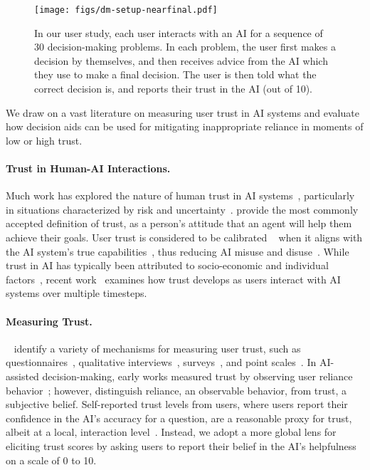 \begin{figure*}
    \centering
    \texttt{[image: figs/dm-setup-nearfinal.pdf]}
    \caption{In our user study, each user interacts with an AI for a sequence of $30$ decision-making problems. In each problem, the user first makes a decision by themselves, and then receives advice from the AI which they use to make a final decision. The user is then told what the correct decision is, and reports their trust in the AI (out of 10).}
    \label{fig:decision_making_setup}
\end{figure*}

We draw on a vast literature on measuring user trust in AI systems and evaluate how decision aids can be used for mitigating inappropriate reliance in moments of low or high trust.

\paragraph{Trust in Human-AI Interactions.} 
Much work has explored the nature of human trust in AI systems~\cite{lai2023towards}, particularly in situations characterized by risk and uncertainty~\cite{jacovi2021formalizing}. 
\citet{lee2004trust} provide the most commonly accepted definition of trust, as a person's attitude that an agent will help them achieve their goals. 
User trust is considered to be calibrated ~\cite{alizadeh2022building} when it aligns with the AI system's true capabilities~\cite{wright2010trust}, thus reducing AI misuse and disuse~\cite{alizadeh2022building}. 
While trust in AI has typically been attributed to socio-economic and individual factors~\cite{bach2024systematic}, recent work~\cite{dhuliawala2023diachronic, pareek2024trust} examines how trust develops as users interact with AI systems over multiple timesteps. 

\paragraph{Measuring Trust.} ~\citet{bach2024systematic} identify a variety of mechanisms for measuring user trust, such as questionnaires~\cite{schaffer2019can}, qualitative interviews~\cite{barda2020qualitative}, surveys~\cite{lin2019building}, and point scales~\cite{gulati2019design}. 
In AI-assisted decision-making, early works measured trust by observing user reliance behavior~\cite{yin2019understanding, zhang2020effect}; however, \citet{de2021defining} distinguish reliance, an observable behavior, from trust, a subjective belief. 
Self-reported trust levels from users, where users report their confidence in the AI's accuracy for a question, are a reasonable proxy for trust, albeit at a local, interaction level~\cite{pareek2024trust, dhuliawala2023diachronic}. 
Instead, we adopt a more global lens for eliciting trust scores by asking users to report their belief in the AI's helpfulness on a scale of 0 to 10.

